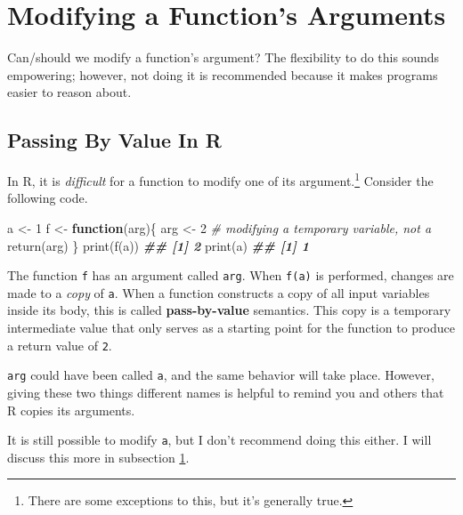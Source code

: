 \documentclass[
  12pt,
  krantz2]{krantz}
\makeatletter
\newenvironment{Shaded}{\begin{snugshade}}{\end{snugshade}}
\newcommand{\CommentTok}[1]{\textcolor[rgb]{0.37,0.37,0.37}{\textit{#1}}}
\newcommand{\ControlFlowTok}[1]{\textcolor[rgb]{0.27,0.27,0.27}{\textbf{#1}}}
\newcommand{\DecValTok}[1]{\textcolor[rgb]{0.06,0.06,0.06}{#1}}
\newcommand{\DocumentationTok}[1]{\textcolor[rgb]{0.37,0.37,0.37}{\textbf{\textit{#1}}}}
\newcommand{\FunctionTok}[1]{\textcolor[rgb]{0,0,0}{#1}}
\newcommand{\NormalTok}[1]{#1}
\newcommand{\OtherTok}[1]{\textcolor[rgb]{0.37,0.37,0.37}{#1}}
\newenvironment{kframe}{%
\medskip{}
\setlength{\fboxsep}{.8em}
 \def\at@end@of@kframe{}%
 \ifinner\ifhmode%
  \def\at@end@of@kframe{\end{minipage}}%
  \begin{minipage}{\columnwidth}%
 \fi\fi%
 \def\FrameCommand##1{\hskip\@totalleftmargin \hskip-\fboxsep
 \colorbox{shadecolor}{##1}\hskip-\fboxsep
     \hskip-\linewidth \hskip-\@totalleftmargin \hskip\columnwidth}%
 \MakeFramed {\advance\hsize-\width
   \@totalleftmargin\z@ \linewidth\hsize
   \@setminipage}}%
 {\par\unskip\endMakeFramed%
 \at@end@of@kframe}
\renewenvironment{Shaded}{\begin{kframe}}{\end{kframe}}
\makeatother
\begin{document}
\hypertarget{modifying-a-functions-arguments}{%
\section{Modifying a Function's Arguments}\label{modifying-a-functions-arguments}}

Can/should we modify a function's argument? The flexibility to do this sounds empowering; however, not doing it is recommended because it makes programs easier to reason about.

\hypertarget{passing-by-value-in-r}{%
\subsection{Passing By Value In R}\label{passing-by-value-in-r}}

In R, it is \emph{difficult} for a function to modify one of its argument.\footnote{There are some exceptions to this, but it's generally true.} Consider the following code.

\begin{Shaded}
\begin{Highlighting}[]
\NormalTok{a }\OtherTok{\textless{}{-}} \DecValTok{1}
\NormalTok{f }\OtherTok{\textless{}{-}} \ControlFlowTok{function}\NormalTok{(arg)\{}
\NormalTok{  arg }\OtherTok{\textless{}{-}} \DecValTok{2} \CommentTok{\# modifying a temporary variable, not a}
  \FunctionTok{return}\NormalTok{(arg)}
\NormalTok{\}}
\FunctionTok{print}\NormalTok{(}\FunctionTok{f}\NormalTok{(a))}
\DocumentationTok{\#\# [1] 2}
\FunctionTok{print}\NormalTok{(a)}
\DocumentationTok{\#\# [1] 1}
\end{Highlighting}
\end{Shaded}

The function \texttt{f} has an argument called \texttt{arg}. When \texttt{f(a)} is performed, changes are made to a \emph{copy} of \texttt{a}. When a function constructs a copy of all input variables inside its body, this is called \textbf{pass-by-value} semantics. This copy is a temporary intermediate value that only serves as a starting point for the function to produce a return value of \texttt{2}.

\texttt{arg} could have been called \texttt{a}, and the same behavior will take place. However, giving these two things different names is helpful to remind you and others that R copies its arguments.

It is still possible to modify \texttt{a}, but I don't recommend doing this either. I will discuss this more in subsection \ref{modifying-a-functions-arguments}.
\end{document}
